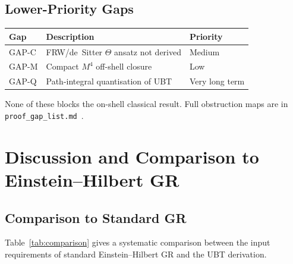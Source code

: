 \documentclass[12pt,a4paper]{article}
\theoremstyle{definition}
\theoremstyle{remark}
\begin{document}
\subsection{Lower-Priority Gaps}

\begin{center}
\begin{tabular}{lll}
\toprule
\textbf{Gap} & \textbf{Description} & \textbf{Priority} \\
\midrule
GAP-C & FRW/de~Sitter $\Theta$ ansatz not derived & Medium \\
GAP-M & Compact $M^4$ off-shell closure & Low \\
GAP-Q & Path-integral quantisation of UBT & Very long term \\
\bottomrule
\end{tabular}
\end{center}

None of these blocks the on-shell classical result.
Full obstruction maps are in \texttt{proof\_gap\_list.md}~\cite{jaros2026_canonical}.

\section{Discussion and Comparison to Einstein--Hilbert GR}
\label{sec:discussion}

\subsection{Comparison to Standard GR}

Table~\ref{tab:comparison} gives a systematic comparison between the input
requirements of standard Einstein--Hilbert GR and the UBT derivation.
\end{document}
